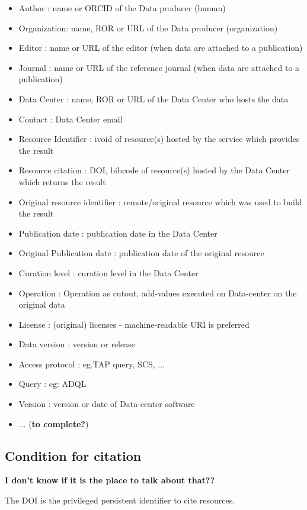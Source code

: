 \documentclass[11pt,a4paper]{ivoa}
\begin{document}
\begin{itemize}
\item Author : name or ORCID of the Data producer (human)
\item Organization:  name, ROR or URL of the Data producer (organization)
\item Editor : name or URL  of the editor (when data are attached to a publication)
\item Journal : name or URL of the reference journal (when data are attached to a publication)
\item Data Center : name, ROR or URL of the Data Center who hosts the data 
\item Contact : Data Center email 
\item Resource Identifier : ivoid of resource(s) hosted by the service which provides the result
\item Resource citation : DOI, bibcode of resource(s) hosted by the Data Center which returns the result 
\item Original resource identifier : remote/original resource which was used to build the result
\item Publication date : publication date in the Data Center 
\item Original Publication date :  publication date of the original resource
\item Curation level : curation level in the Data Center
\item Operation : Operation as cutout, add-values executed on Data-center on the original data
\item License : (original) licenses - machine-readable URI is preferred
\item Data version : version or release
\item Access protocol :  eg.TAP query, SCS, ... 
\item Query : eg: ADQL 
\item Version : version or date of Data-center software
\item ... (\textbf{to complete?})
\end{itemize}


\subsection{Condition for citation}
\textbf{I don't know if it is the place to talk about that??}

The DOI is the privileged persistent identifier to cite resources.\\
\end{document}
